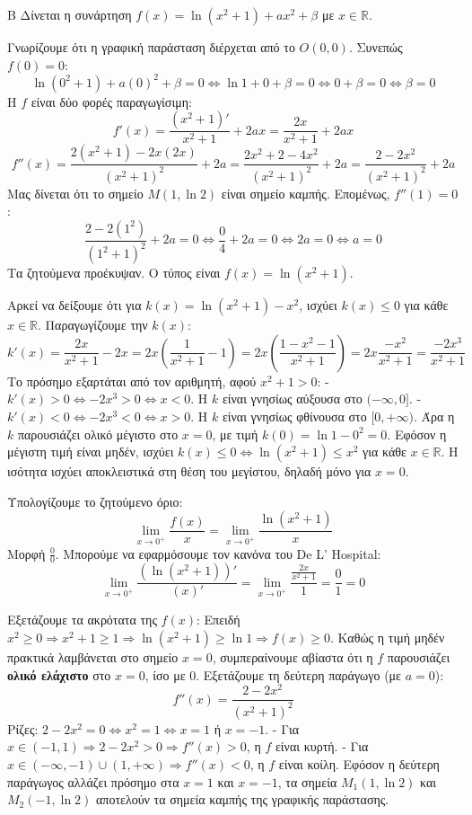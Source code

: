 \begin{thema}{Β}
Δίνεται η συνάρτηση $f(x) = \ln(x^2+1) + a x^2 + \beta$ με $x \in \mathbb{R}$.
\begin{erwthma}
\item Γνωρίζουμε ότι η γραφική παράσταση διέρχεται από το $O(0, 0)$. Συνεπώς $f(0) = 0$:
\[ \ln(0^2+1) + a(0)^2 + \beta = 0 \Leftrightarrow \ln 1 + 0 + \beta = 0 \Leftrightarrow 0 + \beta = 0 \Leftrightarrow \beta = 0 \]
Η $f$ είναι δύο φορές παραγωγίσιμη:
\[ f'(x) = \frac{(x^2+1)'}{x^2+1} + 2ax = \frac{2x}{x^2+1} + 2ax \]
\[ f''(x) = \frac{2(x^2+1) - 2x(2x)}{(x^2+1)^2} + 2a = \frac{2x^2+2-4x^2}{(x^2+1)^2} + 2a = \frac{2-2x^2}{(x^2+1)^2} + 2a \]
Μας δίνεται ότι το σημείο $M(1, \ln 2)$ είναι σημείο καμπής. Επομένως, $f''(1) = 0$:
\[ \frac{2-2(1^2)}{(1^2+1)^2} + 2a = 0 \Leftrightarrow \frac{0}{4} + 2a = 0 \Leftrightarrow 2a = 0 \Leftrightarrow a = 0 \]
Τα ζητούμενα προέκυψαν. Ο τύπος είναι $f(x) = \ln(x^2+1)$.

\item Αρκεί να δείξουμε ότι για $k(x) = \ln(x^2+1) - x^2$, ισχύει $k(x) \le 0$ για κάθε $x \in \mathbb{R}$.
Παραγωγίζουμε την $k(x)$:
\[ k'(x) = \frac{2x}{x^2+1} - 2x = 2x \left(\frac{1}{x^2+1} - 1\right) = 2x \left( \frac{1-x^2-1}{x^2+1} \right) = 2x \frac{-x^2}{x^2+1} = \frac{-2x^3}{x^2+1} \]
Το πρόσημο εξαρτάται από τον αριθμητή, αφού $x^2+1 > 0$:
- $k'(x) > 0 \Leftrightarrow -2x^3 > 0 \Leftrightarrow x < 0$. Η $k$ είναι γνησίως αύξουσα στο $(-\infty, 0]$.
- $k'(x) < 0 \Leftrightarrow -2x^3 < 0 \Leftrightarrow x > 0$. Η $k$ είναι γνησίως φθίνουσα στο $[0, +\infty)$.
Άρα η $k$ παρουσιάζει ολικό μέγιστο στο $x=0$, με τιμή $k(0) = \ln 1 - 0^2 = 0$.
Εφόσον η μέγιστη τιμή είναι μηδέν, ισχύει $k(x) \le 0 \Leftrightarrow \ln(x^2+1) \le x^2$ για κάθε $x \in \mathbb{R}$.
Η ισότητα ισχύει αποκλειστικά στη θέση του μεγίστου, δηλαδή μόνο για $x=0$.

\item Υπολογίζουμε το ζητούμενο όριο:
\[ \lim_{x\to0^+} \frac{f(x)}{x} = \lim_{x\to0^+} \frac{\ln(x^2+1)}{x} \]
Μορφή $\frac{0}{0}$. Μπορούμε να εφαρμόσουμε τον κανόνα του De L' Hospital:
\[ \lim_{x\to0^+} \frac{(\ln(x^2+1))'}{(x)'} = \lim_{x\to0^+} \frac{\frac{2x}{x^2+1}}{1} = \frac{0}{1} = 0 \]

\item Εξετάζουμε τα ακρότατα της $f(x)$:
Επειδή $x^2 \ge 0 \Rightarrow x^2+1 \ge 1 \Rightarrow \ln(x^2+1) \ge \ln 1 \Rightarrow f(x) \ge 0$.
Καθώς η τιμή μηδέν πρακτικά λαμβάνεται στο σημείο $x=0$, συμπεραίνουμε αβίαστα ότι η $f$ παρουσιάζει \textbf{ολικό ελάχιστο} στο $x=0$, ίσο με 0.
Εξετάζουμε τη δεύτερη παράγωγο (με $a=0$):
\[ f''(x) = \frac{2-2x^2}{(x^2+1)^2} \]
Ρίζες: $2 - 2x^2 = 0 \Leftrightarrow x^2 = 1 \Leftrightarrow x = 1$ ή $x = -1$.
- Για $x \in (-1, 1) \Rightarrow 2-2x^2 > 0 \Rightarrow f''(x) > 0$, η $f$ είναι κυρτή.
- Για $x \in (-\infty, -1) \cup (1, +\infty) \Rightarrow f''(x) < 0$, η $f$ είναι κοίλη.
Εφόσον η δεύτερη παράγωγος αλλάζει πρόσημο στα $x=1$ και $x=-1$, τα σημεία $M_1(1, \ln 2)$ και $M_2(-1, \ln 2)$ αποτελούν τα σημεία καμπής της γραφικής παράστασης.
\end{erwthma}
\end{thema}

